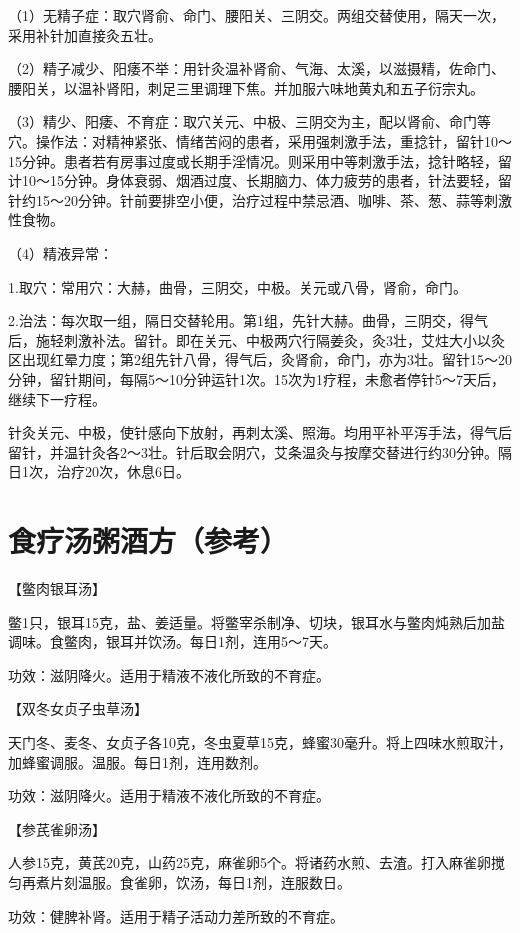 \documentclass[12pt,UTF8,openany]{ctexbook}
\begin{document}
（1）无精子症：取穴肾俞、命门、腰阳关、三阴交。两组交替使用，隔天一次，采用补针加直接灸五壮。

（2）精子减少、阳痿不举：用针灸温补肾俞、气海、太溪，以滋摄精，佐命门、腰阳关，以温补肾阳，刺足三里调理下焦。并加服六味地黄丸和五子衍宗丸。

（3）精少、阳痿、不育症：取穴关元、中极、三阴交为主，配以肾俞、命门等穴。操作法：对精神紧张、情绪苦闷的患者，采用强刺激手法，重捻针，留针10～15分钟。患者若有房事过度或长期手淫情况。则采用中等刺激手法，捻针略轻，留计10～15分钟。身体衰弱、烟酒过度、长期脑力、体力疲劳的患者，针法要轻，留针约15～20分钟。针前要排空小便，治疗过程中禁忌酒、咖啡、茶、葱、蒜等刺激性食物。

（4）精液异常：

1.取穴：常用穴：大赫，曲骨，三阴交，中极。关元或八骨，肾俞，命门。

2.治法：每次取一组，隔日交替轮用。第1组，先针大赫。曲骨，三阴交，得气后，施轻刺激补法。留针。即在关元、中极两穴行隔姜灸，灸3壮，艾炷大小以灸区出现红晕力度；第2组先针八骨，得气后，灸肾俞，命门，亦为3壮。留针15～20分钟，留针期间，每隔5～10分钟运针1次。15次为1疗程，未愈者停针5～7天后，继续下一疗程。

针灸关元、中极，使针感向下放射，再刺太溪、照海。均用平补平泻手法，得气后留针，并温针灸各2～3壮。针后取会阴穴，艾条温灸与按摩交替进行约30分钟。隔日1次，治疗20次，休息6日。





\section{食疗汤粥酒方（参考）}


【鳖肉银耳汤】

鳖1只，银耳15克，盐、姜适量。将鳖宰杀制净、切块，银耳水与鳖肉炖熟后加盐调味。食鳖肉，银耳并饮汤。每日1剂，连用5～7天。

功效：滋阴降火。适用于精液不液化所致的不育症。

【双冬女贞子虫草汤】

天门冬、麦冬、女贞子各10克，冬虫夏草15克，蜂蜜30毫升。将上四味水煎取汁，加蜂蜜调服。温服。每日1剂，连用数剂。

功效：滋阴降火。适用于精液不液化所致的不育症。

【参芪雀卵汤】

人参15克，黄芪20克，山药25克，麻雀卵5个。将诸药水煎、去渣。打入麻雀卵搅匀再煮片刻温服。食雀卵，饮汤，每日1剂，连服数日。

功效：健脾补肾。适用于精子活动力差所致的不育症。
\end{document}
